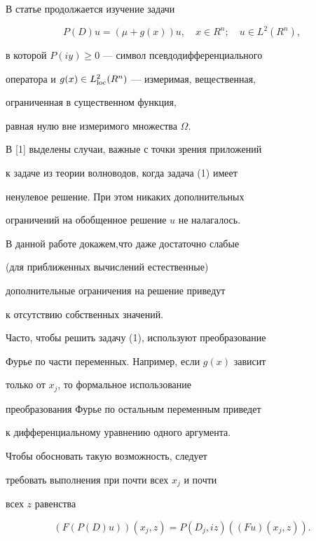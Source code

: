 В статье продолжается изучение задачи


\begin{equation}


P(D)u=(\mu + g(x))u,\quad x \in R^{n} ;\quad u \in


L^{2}(R^{n}) ,


\end{equation}


в которой $ P(iy) \ge 0 $ --- символ псевдодифференциального


оператора и $ g(x)


\in L_{\loc} ^{2}(R^{n}) $ --- измеримая, вещественная,


ограниченная в существенном функция,


равная нулю вне измеримого множества $ \Omega $.





В [1] выделены случаи, важные с точки зрения приложений


к задаче из теории волноводов, когда задача (1) имеет


ненулевое решение. При этом никаких дополнительных


ограничений на обобщенное решение $u$ не налагалось.


В данной работе докажем,что даже достаточно слабые


(для приближенных вычислений естественные)


дополнительные ограничения на решение приведут


к отсутствию собственных значений.





Часто, чтобы решить задачу (1), используют преобразование


Фурье по части переменных. Например, если $g(x)$ зависит


только от $x_{j}$, то формальное использование


преобразования Фурье по остальным переменным приведет


к дифференциальному уравнению одного аргумента.


Чтобы обосновать такую возможность, следует


требовать выполнения при почти всех $x_{j}$ и почти


всех $z$ равенства


\begin{equation}


(F(P(D)u)) (x_{j}, z)= P(D_{j}, iz) ((F u) (x_{j}, z)). 


\end{equation}


